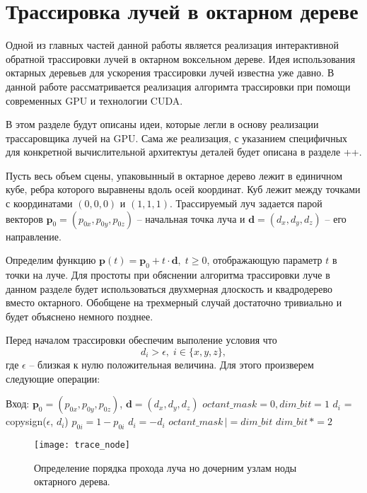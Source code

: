 \section{Трассировка лучей в октарном дереве}

Одной из главных частей данной работы является реализация интерактивной обратной трассировки лучей в октарном воксельном дереве. Идея использования октарных деревьев для ускорения трассировки лучей известна уже давно. В данной работе рассматривается реализация алгоримта трассировки при помощи современных GPU и технологии CUDA.

В этом разделе будут описаны идеи, которые легли в основу реализации трассаровщика лучей на GPU. Сама же реализация, с указанием специфичных для конкретной вычислительной архитектуы деталей будет описана в разделе ++.

Пусть весь объем сцены, упаковынный в октарное дерево лежит в единичном кубе, ребра которого выравнены вдоль осей координат. Куб лежит между точками с координатами $(0, 0, 0)$ и $(1, 1, 1)$. Трассируемый луч задается парой векторов $\mathbf{p}_0 = (p_{0x}, p_{0y}, p_{0z})$ -- начальная точка луча и $\mathbf{d} = (d_{x}, d_{y}, d_{z})$ -- его направление.

Определим функцию $\mathbf{p}(t) = \mathbf{p}_0 + t\cdot\mathbf{d}, \; t \ge 0$, отображающую параметр $t$ в точки на луче. Для простоты при обяснении алгоритма трассировки луче в данном разделе будет использоваться двухмерная длоскость и квадродерево вместо октарного. Обобщене на трехмерный случай достаточно тривиально и будет объяснено немного позднее.

Перед началом трассировки обеспечим выполение условия
что $$d_i > \epsilon,\; i \in \{x, y, z\},$$ где $\epsilon$ -- близкая к нулю положительная величина. Для этого произверем следующие операции:

\begin{algorithmic}
\STATE Вход: $\mathbf{p}_0 = (p_{0x}, p_{0y}, p_{0z})$, $\mathbf{d} = (d_{x}, d_{y}, d_{z})$
\STATE $octant\_mask = 0, dim\_bit = 1$
	    \STATE $d_i$ = copysign($\epsilon$, $d_i$)
	\ENDIF
	    \STATE $p_{0i} = 1 - p_{0i}$
	    \STATE $d_i  = -d_i$
	    \STATE $octant\_mask\,  |= dim\_bit$
	\ENDIF
 	\STATE $dim\_bit\, *= 2$
\ENDFOR
\end{algorithmic}

\begin{figure}[h]
\center
\texttt{[image: trace\_node]}
\caption{Определение порядка прохода луча но дочерним узлам ноды октарного дерева.}
\label{fig:trace_node}
\end{figure}
